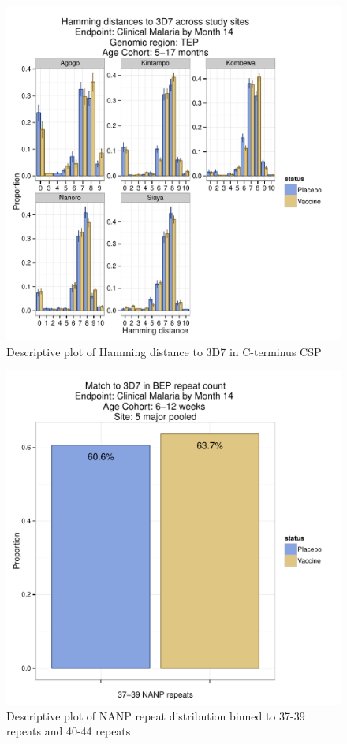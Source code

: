 \documentclass[]{article}
\begin{document}
\begin{figure}[htbp]
\centering
\includegraphics{figures/hamming-infant-sites-c-1.pdf}
\caption{Descriptive plot of Hamming distance to 3D7 in C-terminus CSP}
\end{figure}

\begin{figure}[htbp]
\centering
\includegraphics{figures/bep-cat-newborn-c-1.pdf}
\caption{Descriptive plot of NANP repeat distribution binned to 37-39
repeats and 40-44 repeats}
\end{figure}
\end{document}
